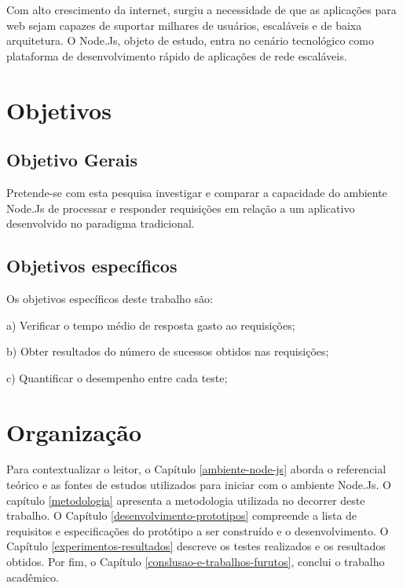   Com alto crescimento da internet, surgiu a necessidade de que as aplicações para web sejam capazes de suportar milhares de usuários,
  escaláveis e de baixa arquitetura. O Node.Js, objeto de estudo, entra no cenário tecnológico como plataforma de desenvolvimento rápido
  de aplicações de rede escaláveis.
  
\section{Objetivos}
\label{objetivos}


\subsection{Objetivo Gerais}

  Pretende-se com esta pesquisa investigar e comparar a capacidade 
  do ambiente Node.Js de processar e responder requisições em relação a um aplicativo desenvolvido 
  no paradigma tradicional.
 
  
\subsection{Objetivos específicos}

  Os objetivos específicos deste trabalho são:
  
    \begin{compactitem}
      \item[a)] Verificar o tempo médio de resposta gasto ao requisições;
      \item[b)] Obter resultados do número de sucessos obtidos nas requisições;
      \item[c)] Quantificar o desempenho entre cada teste;
    \end{compactitem}
  
  
\section{Organização}
\label{organizacao}  

  Para contextualizar o leitor, o Capítulo \ref{ambiente-node-js} aborda o referencial teórico e as fontes de estudos utilizados para iniciar com o ambiente 
  Node.Js. O capítulo \ref{metodologia} apresenta a metodologia utilizada no decorrer deste trabalho. O Capítulo \ref{desenvolvimento-prototipos} compreende a lista de requisitos e especificações do protótipo a ser construído e o
  desenvolvimento. O Capítulo \ref{experimentos-resultados} descreve os testes realizados e os resultados obtidos. 
  Por fim, o Capítulo \ref{conslusao-e-trabalhos-furutos}, conclui o trabalho acadêmico.